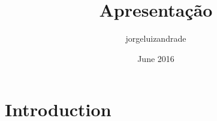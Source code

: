 \documentclass{article}
\title{Apresentação}
\author{jorgeluizandrade }
\date{June 2016}
\begin{document}
\maketitle

\section{Introduction}
\end{document}
